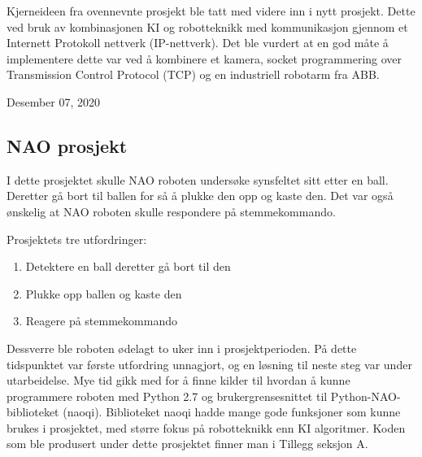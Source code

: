 \documentclass[conference]{IEEEtran}
\begin{document}
Kjerneideen fra ovennevnte prosjekt ble tatt med videre inn i nytt prosjekt. Dette ved bruk av kombinasjonen KI og robotteknikk med kommunikasjon 
gjennom et Internett Protokoll nettverk (IP-nettverk). Det ble vurdert at en god måte å implementere dette var ved å kombinere et kamera, socket 
programmering over Transmission Control Protocol  (TCP) og en industriell robotarm fra ABB.
 
\hfill Desember 07, 2020

    \subsection{NAO prosjekt}
    I dette prosjektet skulle NAO roboten undersøke synsfeltet sitt etter en ball. Deretter gå bort til ballen for så å plukke den opp og kaste den. 
    Det var også ønskelig at NAO roboten skulle respondere på stemmekommando. 

        Prosjektets tre utfordringer:
        \begin{enumerate}
            \item Detektere en ball deretter gå bort til den 
            \item Plukke opp ballen og kaste den
            \item Reagere på stemmekommando 
        \end{enumerate}
        
        Dessverre ble roboten ødelagt to uker inn i prosjektperioden. På dette tidspunktet var første utfordring unnagjort, 
        og en løsning til neste steg var under utarbeidelse. Mye tid gikk med for å finne kilder til hvordan å kunne programmere roboten med Python 2.7 
        og brukergrensesnittet til Python-NAO-biblioteket (naoqi). Biblioteket naoqi hadde mange gode funksjoner som kunne brukes i prosjektet, med 
        større fokus på robotteknikk enn KI algoritmer. Koden som ble produsert under dette prosjektet finner man i Tillegg seksjon A.
\end{document}
